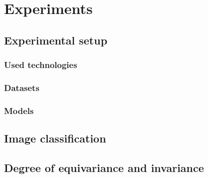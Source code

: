 \section{Experiments}
\subsection{Experimental setup}
    \subsubsection{Used technologies}
    \subsubsection{Datasets}
    \subsubsection{Models}

\subsection{Image classification}

\subsection{Degree of equivariance and invariance}

